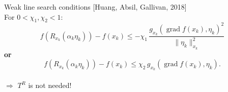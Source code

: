 \documentclass[9.4pt]{beamer}
\begin{document}

\begin{frame}{Weak line search conditions}
    \vspace{-1\baselineskip}\hfill{\tiny{[Huang, Absil, Gallivan, 2018]}} \\
    For $0 < \chi_1, \chi_2 < 1$:
    \begin{equation}
        f(R_{x_k}(\alpha_k \eta_k)) - f(x_k) \leq - \chi_1 \, \frac{{g_{x_k} (\operatorname{grad} f(x_k), \eta_k)}^2}{\lVert \eta_k \rVert^2_{x_k}}
    \end{equation} 
    \textbf{or}
    \begin{equation}
        f(R_{x_k}(\alpha_k \eta_k)) - f(x_k) \leq \chi_2 \, g_{x_k} (\operatorname{grad} f(x_k), \eta_k).
    \end{equation} \\[1.\baselineskip]
    $\Rightarrow$ $T^R$ is not needed!
\end{frame}
\end{document}
